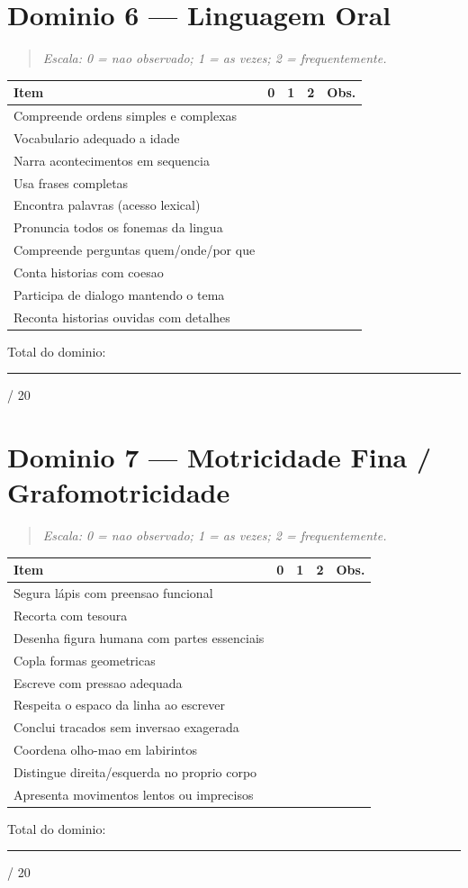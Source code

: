 \documentclass[a4paper,11pt]{book}
\begin{document}
\section{Dominio 6 --- Linguagem Oral}
\begin{quote}\itshape Escala: 0 = nao observado; 1 = as vezes; 2 = frequentemente.\end{quote}
\begin{tabular}{@{}p{10.5cm}ccc p{0.5cm}@{}}\toprule
Item & 0 & 1 & 2 & Obs. \\\midrule
Compreende ordens simples e complexas & & & & \\
Vocabulario adequado a idade & & & & \\
Narra acontecimentos em sequencia & & & & \\
Usa frases completas & & & & \\
Encontra palavras (acesso lexical) & & & & \\
Pronuncia todos os fonemas da lingua & & & & \\
Compreende perguntas quem/onde/por que & & & & \\
Conta historias com coesao & & & & \\
Participa de dialogo mantendo o tema & & & & \\
Reconta historias ouvidas com detalhes & & & & \\
\bottomrule\end{tabular}
\vspace{0.2cm}\noindent\small Total do dominio: \rule{1cm}{0.3pt} / 20\par\medskip


\section{Dominio 7 --- Motricidade Fina / Grafomotricidade}
\begin{quote}\itshape Escala: 0 = nao observado; 1 = as vezes; 2 = frequentemente.\end{quote}
\begin{tabular}{@{}p{10.5cm}ccc p{0.5cm}@{}}\toprule
Item & 0 & 1 & 2 & Obs. \\\midrule
Segura lápis com preensao funcional & & & & \\
Recorta com tesoura & & & & \\
Desenha figura humana com partes essenciais & & & & \\
Copla formas geometricas & & & & \\
Escreve com pressao adequada & & & & \\
Respeita o espaco da linha ao escrever & & & & \\
Conclui tracados sem inversao exagerada & & & & \\
Coordena olho-mao em labirintos & & & & \\
Distingue direita/esquerda no proprio corpo & & & & \\
Apresenta movimentos lentos ou imprecisos & & & & \\
\bottomrule\end{tabular}
\vspace{0.2cm}\noindent\small Total do dominio: \rule{1cm}{0.3pt} / 20\par\medskip
\end{document}
